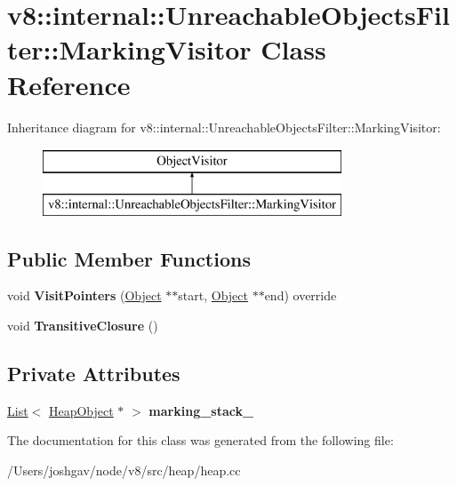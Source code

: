 \hypertarget{classv8_1_1internal_1_1_unreachable_objects_filter_1_1_marking_visitor}{}\section{v8\+:\+:internal\+:\+:Unreachable\+Objects\+Filter\+:\+:Marking\+Visitor Class Reference}
\label{classv8_1_1internal_1_1_unreachable_objects_filter_1_1_marking_visitor}
Inheritance diagram for v8\+:\+:internal\+:\+:Unreachable\+Objects\+Filter\+:\+:Marking\+Visitor\+:\begin{figure}[H]
\begin{center}
\leavevmode
\includegraphics[height=2.000000cm]{classv8_1_1internal_1_1_unreachable_objects_filter_1_1_marking_visitor}
\end{center}
\end{figure}
\subsection*{Public Member Functions}
\begin{DoxyCompactItemize}
\item 
void {\bfseries Visit\+Pointers} (\hyperlink{classv8_1_1internal_1_1_object}{Object} $\ast$$\ast$start, \hyperlink{classv8_1_1internal_1_1_object}{Object} $\ast$$\ast$end) override\hypertarget{classv8_1_1internal_1_1_unreachable_objects_filter_1_1_marking_visitor_a47822e4b1320181c8124c26af92effc6}{}\label{classv8_1_1internal_1_1_unreachable_objects_filter_1_1_marking_visitor_a47822e4b1320181c8124c26af92effc6}

\item 
void {\bfseries Transitive\+Closure} ()\hypertarget{classv8_1_1internal_1_1_unreachable_objects_filter_1_1_marking_visitor_a20ec6d768204cf8d2135524ec26340c4}{}\label{classv8_1_1internal_1_1_unreachable_objects_filter_1_1_marking_visitor_a20ec6d768204cf8d2135524ec26340c4}

\end{DoxyCompactItemize}
\subsection*{Private Attributes}
\begin{DoxyCompactItemize}
\item 
\hyperlink{classv8_1_1internal_1_1_list}{List}$<$ \hyperlink{classv8_1_1internal_1_1_heap_object}{Heap\+Object} $\ast$ $>$ {\bfseries marking\+\_\+stack\+\_\+}\hypertarget{classv8_1_1internal_1_1_unreachable_objects_filter_1_1_marking_visitor_a3e3cdd1bea89f1dc01158c1c40be7fe4}{}\label{classv8_1_1internal_1_1_unreachable_objects_filter_1_1_marking_visitor_a3e3cdd1bea89f1dc01158c1c40be7fe4}

\end{DoxyCompactItemize}


The documentation for this class was generated from the following file\+:\begin{DoxyCompactItemize}
\item 
/\+Users/joshgav/node/v8/src/heap/heap.\+cc\end{DoxyCompactItemize}
